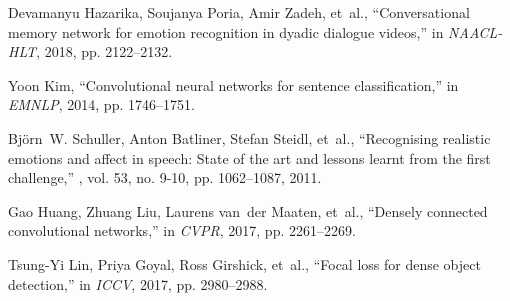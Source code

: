 \begin{thebibliography}{10}
  Devamanyu Hazarika, Soujanya Poria, Amir Zadeh, et~al.,
  \newblock ``Conversational memory network for emotion recognition in dyadic
    dialogue videos,''
  \newblock in {\em {NAACL-HLT}}, 2018, pp. 2122--2132.
  
  Yoon Kim,
  \newblock ``Convolutional neural networks for sentence classification,''
  \newblock in {\em {EMNLP}}, 2014, pp. 1746--1751.
  
  Bj{\"{o}}rn~W. Schuller, Anton Batliner, Stefan Steidl, et~al.,
  \newblock ``Recognising realistic emotions and affect in speech: State of the
    art and lessons learnt from the first challenge,''
  , vol. 53, no. 9-10, pp. 1062--1087, 2011.
  
  Gao Huang, Zhuang Liu, Laurens van~der Maaten, et~al.,
  \newblock ``Densely connected convolutional networks,''
  \newblock in {\em {CVPR}}, 2017, pp. 2261--2269.
  
  Tsung-Yi Lin, Priya Goyal, Ross Girshick, et~al.,
  \newblock ``Focal loss for dense object detection,''
  \newblock in {\em ICCV}, 2017, pp. 2980--2988.
  
  \end{thebibliography}

